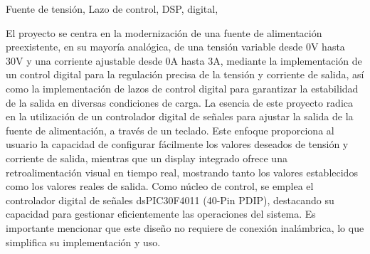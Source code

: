 
\begin{resumen}{Fuente de tensión, Lazo de control, DSP, digital,}

El proyecto se centra en la modernización de una fuente de alimentación preexistente, en su mayoría analógica, de una tensión variable desde 0V hasta 30V y una corriente ajustable desde 0A hasta 3A, mediante la implementación de un control digital para la regulación precisa de la tensión y corriente de salida, así como la implementación de lazos de control digital para garantizar la estabilidad de la salida en diversas condiciones de carga. 
La esencia de este proyecto radica en la utilización de un controlador digital de señales para ajustar la salida de la fuente de alimentación, a través de un teclado. Este enfoque proporciona al usuario la capacidad de configurar fácilmente los valores deseados de tensión y corriente de salida, mientras que un display integrado ofrece una retroalimentación visual en tiempo real, mostrando tanto los valores establecidos como los valores reales de salida.
Como núcleo de control, se emplea el controlador digital de señales dsPIC30F4011 (40-Pin PDIP), destacando su capacidad para gestionar eficientemente las operaciones del sistema. Es importante mencionar que este diseño no requiere de conexión inalámbrica, lo que simplifica su implementación y uso.


\end{resumen}
